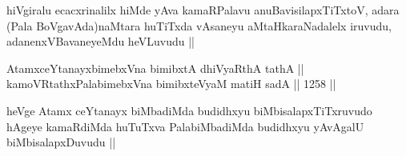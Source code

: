 \begin{artha}
hiVgiralu ecacxrinalilx hiMde yAva kamaRPalavu anuBavisilapxTiTxtoV, adara (Pala BoVgavAda)naMtara huTiTxda vAsaneyu aMtaHkaraNadalelx iruvudu, adanenxVBavaneyeMdu heVLuvudu ||
\end{artha}


\begin{shl}
AtamxceYtanayxbimebxVna bimibxtA dhiVyaRthA tathA || \\
kamoVRtathxPalabimebxVna bimibxteVyaM matiH sadA ||  1258 ||  
\end{shl}

\begin{artha}
heVge Atamx ceYtanayx biMbadiMda budidhxyu biMbisalapxTiTxruvudo hAgeye kamaRdiMda huTuTxva PalabiMbadiMda budidhxyu yAvAgalU biMbisalapxDuvudu ||
\end{artha}
